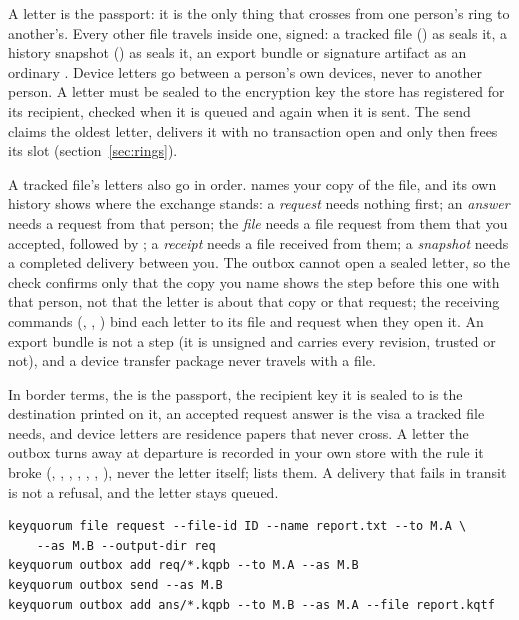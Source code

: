 A  letter is the passport: it is the only thing that crosses from
one person's ring to another's. Every other file travels inside one, signed:
a tracked file () as  seals it, a history
snapshot () as  seals it, an export bundle
or signature artifact as an ordinary . Device letters go between a
person's own devices, never to another person. A letter must be sealed to the
encryption key the store has registered for its recipient, checked when it is
queued and again when it is sent. The send claims the oldest letter, delivers it with no
transaction open and only then frees its slot (section~\ref{sec:rings}).

A tracked file's letters also go in order.  names your copy of
the file, and its own history shows where the exchange stands: a
\emph{request} needs nothing first; an \emph{answer} needs a request from that
person; the \emph{file} needs a file request from them that you accepted,
followed by ; a \emph{receipt} needs a file received from
them; a \emph{snapshot} needs a completed delivery between you. The outbox
cannot open a sealed letter, so the check confirms only that the copy you name
shows the step before this one with that person, not that the letter is about
that copy or that request; the receiving commands (,
, ) bind each letter to its file and
request when they open it. An export
bundle is not a step (it is unsigned and carries every revision, trusted or
not), and a device transfer package never travels with a file.

In border terms, the  is the passport, the recipient key it is
sealed to is the destination printed on it, an accepted request answer is the
visa a tracked file needs, and device letters are residence papers that never
cross. A letter the outbox turns away at departure is recorded in your own
store with the rule it broke (, ,
, , ,
, ), never the letter itself;
 lists them. A delivery that fails in transit is not a
refusal, and the letter stays queued.

\begin{verbatim}
keyquorum file request --file-id ID --name report.txt --to M.A \
    --as M.B --output-dir req
keyquorum outbox add req/*.kqpb --to M.A --as M.B
keyquorum outbox send --as M.B
keyquorum outbox add ans/*.kqpb --to M.B --as M.A --file report.kqtf
\end{verbatim}

